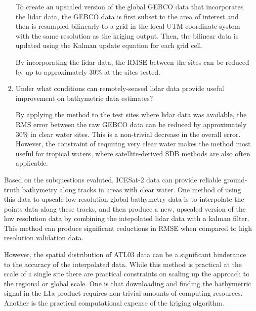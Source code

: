 \begin{enumerate}
    To create an upscaled version of the global GEBCO data that incorporates the lidar data, the GEBCO data is first subset to the area of interest and then is resampled bilinearly to a grid in the local UTM coordinate system with the same resolution as the kriging output. Then, the bilinear data is updated using the Kalman update equation for each grid cell. 

    By incorporating the lidar data, the RMSE between the sites can be reduced by up to approximately 30\% at the sites tested.
    
    \item Under what conditions can remotely-sensed lidar data provide useful improvement on bathymetric data estimates?
    
    By applying the method to the test sites where lidar data was available, the RMS error between the raw GEBCO data can be reduced by approximately 30\% in clear water sites. This is a non-trivial decrease in the overall error. However, the constraint of requiring very clear water makes the method most useful for tropical waters, where satellite-derived SDB methods are also often applicable. 

\end{enumerate}


Based on the subquestions evaluted, ICESat-2 data can provide reliable ground-truth bathymetry along tracks in areas with clear water. One method of using this data to upscale low-resolution global bathymetry data is to interpolate the points data along these tracks, and then produce a new, upscaled version of the low resolution data by combining the intepolated lidar data with a kalman filter. This method can produce significant reductions in RMSE when compared to high resolution validation data. 

However, the spatial distribution of ATL03 data can be a significant hinderance to the accuracy of the interpolated data. While this method is practical at the scale of a single site  there are practical constraints on scaling up the approach to the regional or global scale. One is that downloading and finding the bathymetric signal in the L1a product requires non-trivial amounts of computing resources. Another is the practical computational expense of the kriging algorithm.

